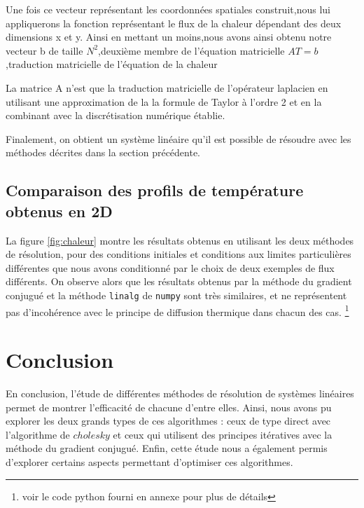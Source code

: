 \documentclass[a4paper]{article}
\begin{document}
Une fois ce vecteur représentant les coordonnées spatiales construit,nous lui appliquerons la fonction représentant le flux de la chaleur dépendant des deux dimensions x et y.
Ainsi en mettant un moins,nous avons ainsi obtenu notre vecteur b de taille $N^2$,deuxième membre de l'équation matricielle $AT=b$ ,traduction matricielle de l'équation de la chaleur 

La matrice A n'est que la traduction matricielle de l'opérateur laplacien en utilisant une approximation de la la formule de Taylor à l'ordre 2 et en la combinant avec la discrétisation numérique établie.

Finalement, on obtient un système linéaire qu'il est possible de résoudre avec les méthodes décrites dans la section précédente.

\subsection{Comparaison des profils de température obtenus en 2D}

La figure \ref{fig:chaleur} montre les résultats obtenus en utilisant les deux méthodes de résolution, pour des conditions initiales et conditions aux limites particulières différentes que nous avons conditionné par le choix de deux exemples de flux différents.
On observe alors que les résultats obtenus par la méthode du gradient conjugué et la méthode \texttt{linalg} de \texttt{numpy} sont très similaires, et ne représentent pas d'incohérence avec le principe de diffusion thermique dans chacun des cas.
\footnote{voir le code python fourni en annexe pour plus de détails}

\section*{Conclusion}

En conclusion, l'étude de différentes méthodes de résolution de systèmes linéaires permet de montrer l'efficacité de chacune d'entre elles. Ainsi, nous avons pu explorer les deux grands types de ces algorithmes : ceux de type direct avec l'algorithme de $cholesky$ et ceux qui utilisent des principes itératives avec la méthode du gradient conjugué. Enfin, cette étude nous a également permis d'explorer certains aspects permettant d'optimiser ces algorithmes.
\end{document}
